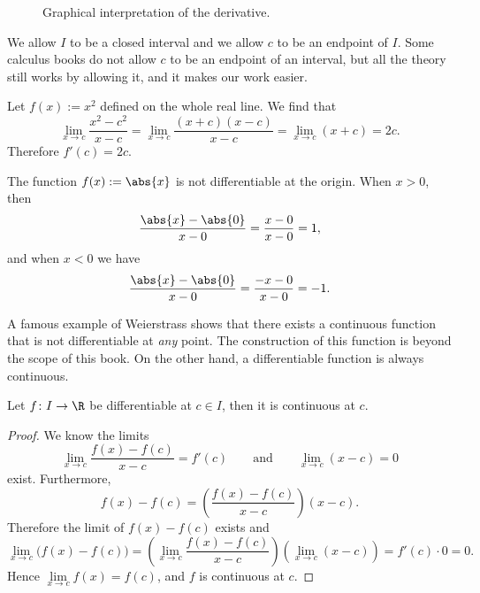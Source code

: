 \documentclass[12pt]{book}
\begin{document}
\begin{figure}[h!t]
\begin{center}

\qquad

\caption{Graphical interpretation of the derivative.\label{derivfig}}
\end{center}
\end{figure}

We allow $I$ to be a closed interval and we allow
$c$ to be an endpoint of $I$.
Some calculus books do not allow $c$ to be an
endpoint of an interval, but all the theory still works by allowing it, and
it makes our work easier.

\begin{example}
Let $f(x) := x^2$ defined on the whole real line.
We find that
\begin{equation*}
\lim_{x\to c} \frac{x^2-c^2}{x-c} =
\lim_{x\to c} \frac{(x+c)(x-c)}{x-c} =
\lim_{x\to c} (x+c) = 2c.
\end{equation*}
Therefore $f'(c) = 2c$.
\end{example}

\begin{example}
The function $f(x) := \abs{x}$ is not differentiable
at the origin.
When $x > 0$, then
\begin{equation*}
\frac{\abs{x}-\abs{0}}{x-0} =
\frac{x-0}{x-0} = 1 ,
\end{equation*}
and when $x < 0$ we have
\begin{equation*}
\frac{\abs{x}-\abs{0}}{x-0} =
\frac{-x-0}{x-0} = -1 .
\end{equation*}
\end{example}

A famous example of Weierstrass shows that there exists a continuous
function that is not differentiable at \emph{any} point.
The construction
of this function is beyond the scope of this book.
On the other hand,
a differentiable function
is always continuous.

\begin{prop}
Let $f \colon I \to \R$ be differentiable at $c \in I$,
then it is continuous at $c$.
\end{prop}

\begin{proof}
We know the limits
\begin{equation*}
\lim_{x\to c}\frac{f(x)-f(c)}{x-c} = f'(c)
\qquad
\text{and}
\qquad
\lim_{x\to c}(x-c) = 0
\end{equation*}
exist.
Furthermore,
\begin{equation*}
f(x)-f(c) = 
\left( \frac{f(x)-f(c)}{x-c} \right) (x-c) .
\end{equation*}
Therefore the limit of $f(x)-f(c)$ exists and
\begin{equation*}
\lim_{x\to c} \bigl( f(x)-f(c) \bigr) =
\left(\lim_{x\to c} \frac{f(x)-f(c)}{x-c} \right)
\left(\lim_{x\to c} (x-c) \right) =
f'(c) \cdot 0  = 0.
\end{equation*}
Hence $\lim\limits_{x\to c} f(x) = f(c)$, and $f$ is continuous at $c$.
\end{proof}
\end{document}
